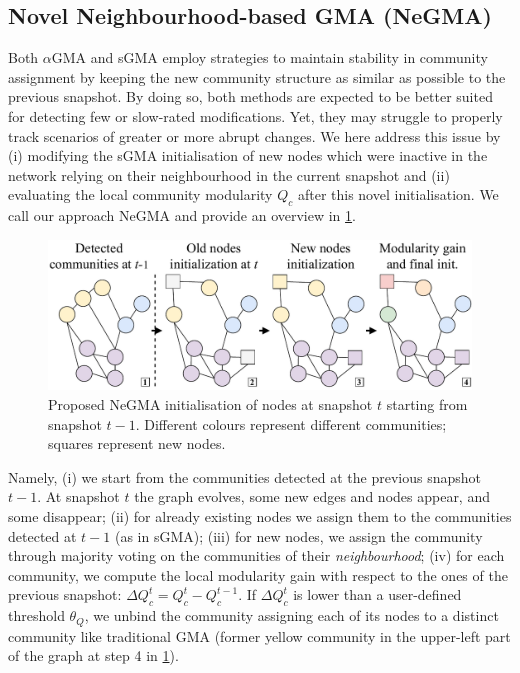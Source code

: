 \documentclass[letterpaper]{article}
\begin{document}
\subsection{Novel Neighbourhood-based GMA (NeGMA)}

Both $\alpha$GMA and sGMA employ strategies to maintain stability in community assignment by keeping the new community structure as similar as possible to the previous snapshot. By doing so, both methods are expected to be better suited for detecting few or slow-rated modifications. Yet, they may struggle to properly track scenarios of greater or more abrupt changes. 
We here address this issue by (i) modifying the sGMA initialisation of new nodes which were inactive in the network relying on their neighbourhood in the current snapshot and (ii) evaluating the local community modularity $Q_c$ after this novel initialisation.
We call our approach NeGMA and provide an overview in \cref{fig:negma}. 

\begin{figure}[!t]
    \centering
    \includegraphics[width=\linewidth]{figures/negma.pdf}
    \caption{Proposed NeGMA initialisation of nodes at snapshot $t$ starting from snapshot $t-1$. Different colours represent different communities; squares represent new nodes.}
    \label{fig:negma}
\end{figure}

Namely, (i) we start from the communities detected at the previous snapshot $t-1$. At snapshot $t$ the graph evolves, some new edges and nodes appear, and some disappear; (ii) for already existing nodes we assign them to the communities detected at $t-1$ (as in sGMA); (iii) for new nodes, we assign the community through majority voting on the communities of their \emph{neighbourhood}; (iv) for each community, we compute the local modularity gain with respect to the ones of the previous snapshot: $\Delta Q_c^t = Q_c^{t} - Q_c^{t-1}$. If $\Delta Q_c^t$ is lower than a user-defined threshold $\theta_Q$, we unbind the community assigning each of its nodes to a distinct community like traditional GMA (former yellow community in the upper-left part of the graph at step 4 in \cref{fig:negma}).
\end{document}
